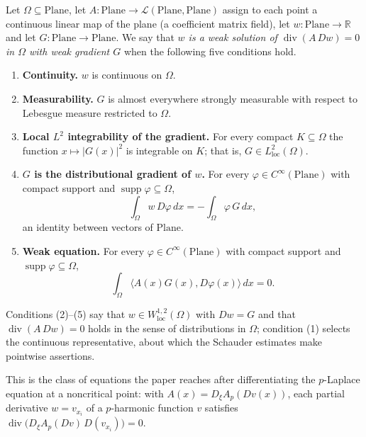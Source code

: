 \begin{definition}
Let $\Omega\subseteq\mathrm{Plane}$, let
$A\colon\mathrm{Plane}\to\mathcal{L}(\mathrm{Plane},\mathrm{Plane})$ assign to each point a
continuous linear map of the plane (a coefficient matrix field), let
$w\colon\mathrm{Plane}\to\mathbb{R}$ and let $G\colon\mathrm{Plane}\to\mathrm{Plane}$.
We say that \emph{$w$ is a weak solution of $\operatorname{div}(A\,Dw)=0$ in $\Omega$ with
weak gradient $G$} when the following five conditions hold.
\begin{enumerate}
\item \textbf{Continuity.} $w$ is continuous on $\Omega$.
\item \textbf{Measurability.} $G$ is almost everywhere strongly measurable with respect to
Lebesgue measure restricted to $\Omega$.
\item \textbf{Local $L^2$ integrability of the gradient.} For every compact
$K\subseteq\Omega$ the function $x\mapsto\lvert G(x)\rvert^{2}$ is integrable on $K$; that
is, $G\in L^2_{\mathrm{loc}}(\Omega)$.
\item \textbf{$G$ is the distributional gradient of $w$.} For every
$\varphi\in C^\infty(\mathrm{Plane})$ with compact support and
$\operatorname{supp}\varphi\subseteq\Omega$,
\[
  \int_\Omega w\,D\varphi\,dx = -\int_\Omega \varphi\,G\,dx ,
\]
an identity between vectors of $\mathrm{Plane}$.
\item \textbf{Weak equation.} For every $\varphi\in C^\infty(\mathrm{Plane})$ with compact
support and $\operatorname{supp}\varphi\subseteq\Omega$,
\[
  \int_\Omega\bigl\langle A(x)G(x),D\varphi(x)\bigr\rangle\,dx = 0 .
\]
\end{enumerate}
Conditions (2)--(5) say that $w\in W^{1,2}_{\mathrm{loc}}(\Omega)$ with $Dw=G$ and that
$\operatorname{div}(A\,Dw)=0$ holds in the sense of distributions in $\Omega$; condition (1)
selects the continuous representative, about which the Schauder estimates make pointwise
assertions.

This is the class of equations the paper reaches after differentiating the $p$-Laplace
equation at a noncritical point: with $A(x)=D_\xi A_p(Dv(x))$, each partial derivative
$w=v_{x_i}$ of a $p$-harmonic function $v$ satisfies
$\operatorname{div}\bigl(D_\xi A_p(Dv)\,D(v_{x_i})\bigr)=0$.
\end{definition}
